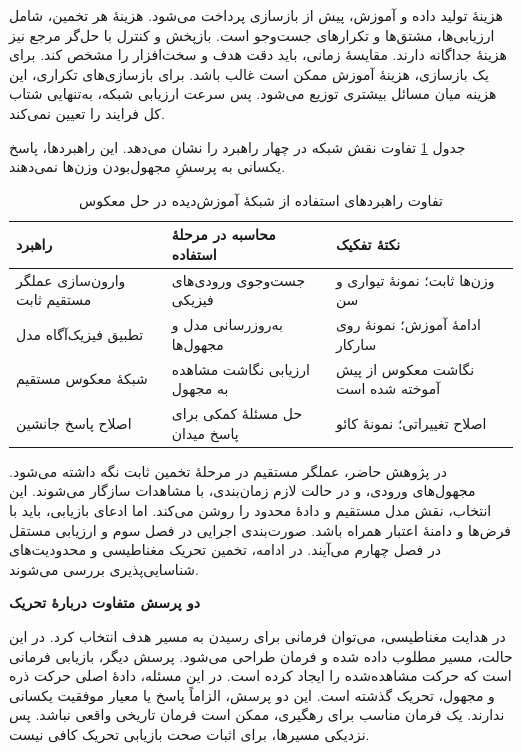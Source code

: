 هزینهٔ تولید داده و آموزش، پیش از بازسازی پرداخت می‌شود.
هزینهٔ هر تخمین، شامل ارزیابی‌ها، مشتق‌ها و تکرارهای جست‌وجو است.
بازپخش و کنترل با حل‌گر مرجع نیز هزینهٔ جداگانه دارند.
مقایسهٔ زمانی، باید دقت هدف و سخت‌افزار را مشخص کند.
برای یک بازسازی، هزینهٔ آموزش ممکن است غالب باشد.
برای بازسازی‌های تکراری، این هزینه میان مسائل بیشتری توزیع می‌شود.
پس سرعت ارزیابی شبکه، به‌تنهایی شتاب کل فرایند را تعیین نمی‌کند.

جدول \ref{tab:lit-inverse-operator-strategies} تفاوت نقش شبکه در چهار راهبرد را نشان می‌دهد.
این راهبردها، پاسخ یکسانی به پرسشِ مجهول‌بودن وزن‌ها نمی‌دهند.

\begin{table}[htbp]
\centering
\small
\caption{تفاوت راهبردهای استفاده از شبکهٔ آموزش‌دیده در حل معکوس}
\label{tab:lit-inverse-operator-strategies}
\begin{tabular}{p{}p{}p{}}
\hline
راهبرد & محاسبه در مرحلهٔ استفاده & نکتهٔ تفکیک \\
\hline
وارون‌سازی عملگر مستقیم ثابت
& جست‌وجوی ورودی‌های فیزیکی
& وزن‌ها ثابت؛ نمونهٔ تیواری و سن \cite{Tiwari2026BayesianCFD} \\
تطبیق فیزیک‌آگاه مدل
& به‌روزرسانی مدل و مجهول‌ها
& ادامهٔ آموزش؛ نمونهٔ روی سارکار \cite{RoySarkar2026HiddenPhysics} \\
شبکهٔ معکوس مستقیم
& ارزیابی نگاشت مشاهده به مجهول
& نگاشت معکوس از پیش آموخته شده است \\
اصلاح پاسخ جانشین
& حل مسئلهٔ کمکی برای پاسخ میدان
& اصلاح تغییراتی؛ نمونهٔ کائو \cite{Cao2023ResidualCorrection} \\
\hline
\end{tabular}
\end{table}

در پژوهش حاضر، عملگر مستقیم در مرحلهٔ تخمین ثابت نگه داشته می‌شود.
مجهول‌های ورودی، و در حالت لازم زمان‌بندی، با مشاهدات سازگار می‌شوند.
این انتخاب، نقش مدل مستقیم و دادهٔ محدود را روشن می‌کند.
اما ادعای بازیابی، باید با فرض‌ها و دامنهٔ اعتبار همراه باشد.
صورت‌بندی اجرایی در فصل سوم و ارزیابی مستقل در فصل چهارم می‌آیند.
در ادامه، تخمین تحریک مغناطیسی و محدودیت‌های شناسایی‌پذیری بررسی می‌شوند.

\label{sec:lit-magnetic-inverse-tracking}

\textbf{دو پرسش متفاوت دربارهٔ تحریک}

در هدایت مغناطیسی، می‌توان فرمانی برای رسیدن به مسیر هدف انتخاب کرد.
در این حالت، مسیر مطلوب داده شده و فرمان طراحی می‌شود.
پرسش دیگر، بازیابی فرمانی است که حرکت مشاهده‌شده را ایجاد کرده است.
در این مسئله، دادهٔ اصلی حرکت ذره و مجهول، تحریک گذشته است.
این دو پرسش، الزاماً پاسخ یا معیار موفقیت یکسانی ندارند.
یک فرمان مناسب برای رهگیری، ممکن است فرمان تاریخی واقعی نباشد.
پس نزدیکی مسیرها، برای اثبات صحت بازیابی تحریک کافی نیست.

